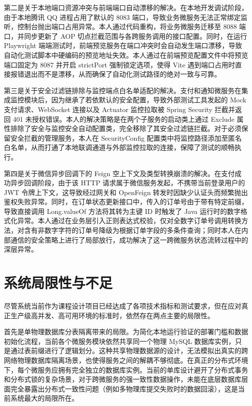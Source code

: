 第二是关于本地端口资源冲突与前端端口自动漂移的解决。在本地开发调试阶段，由于本地腾讯 QQ 进程占用了默认的 8083 端口，导致业务微服务无法正常绑定监听，控制台抛出端口占用异常。本人通过代码重构，将业务微服务迁移至 8088 端口，并同步更新了 AOP 切点拦截范围与各跨服务调用的接口配置。同时，在运行 Playwright 端端测试时，前端预览服务在端口冲突时会自动发生端口漂移，导致自动化测试脚本中硬编码的预览地址失效。本人通过在前端预览配置文件中将预览端口固定为 8087 并开启 strictPort 强制锁定选项，使得 Vite 遇到端口占用时直接报错退出而不是漂移，从而确保了自动化测试路径的绝对一致与可靠。

第三是关于安全过滤链排除与监控端点白名单适配的解决。支付和通知微服务在集成监控模块后，因为继承了若依默认的安全配置，导致外部测试工具发起的 Mock 支付请求、WebSocket 连接以及 Actuator 监控拉取被 Spring Security 拦截并返回 401 未授权错误。本人的解决策略是在两个子服务的启动类上通过 Exclude 属性排除了安全与监控安全自动配置类，完全移除了其安全过滤链拦截。对于必须保留安全拦截的管理服务，本人在 SecurityConfig 配置类中将监控路径添加至匿名白名单，从而打通了本地联调通道与外部监控拉取的连接，保障了测试的顺畅执行。

第四是关于微信异步回调下的 Feign 空上下文及类型转换崩溃的解决。在支付成功异步回调阶段，由于该 HTTP 请求属于微信服务发起，不携带当前登录用户的 JWT 令牌上下文，这导致经过网关和 OpenFeign 转发时因缺少认证头而频繁抛出鉴权失败异常。同时，在订单状态更新接口中，传入的订单号由于带有特定前缀，导致直接调用 Long.valueOf 方法将其转为主键 ID 时触发了 Java 运行时的数字格式化异常。本人通过在业务层引入正则表达式校验，仅对全数字订单号调用转换方法，对含有非数字字符的订单号降级为根据订单字段的多条件查询；同时本人在内部通信的安全策略上进行了局部放行，成功解决了这一跨微服务状态流转过程中的深层异常。

\section{系统局限性与不足}

尽管系统当前作为课程设计项目已经达成了各项技术指标和测试要求，但在应对真正生产级高并发、高可用环境的标准时，依然存在两点主要的局限性。

首先是单物理数据库分表隔离带来的局限。为简化本地运行验证的部署门槛和数据初始化流程，当前各个微服务模块依然共享同一个物理 MySQL 数据库实例，只是通过表前缀进行了逻辑划分。这种共享物理数据源的设计，无法模拟出真实的跨网络物理数据库隔离场景，也使得服务之间的解耦不够彻底。在真正的分布式环境下，每个微服务应拥有完全独立的数据库实例。当前的单库设计避开了分布式事务和分布式锁的复杂场景，对于跨微服务的强一致性数据操作，未能在底层数据库层面完全暴露出分布式一致性问题（例如多物理库提交失败时的数据回滚），这是当前系统最大的局限所在。

